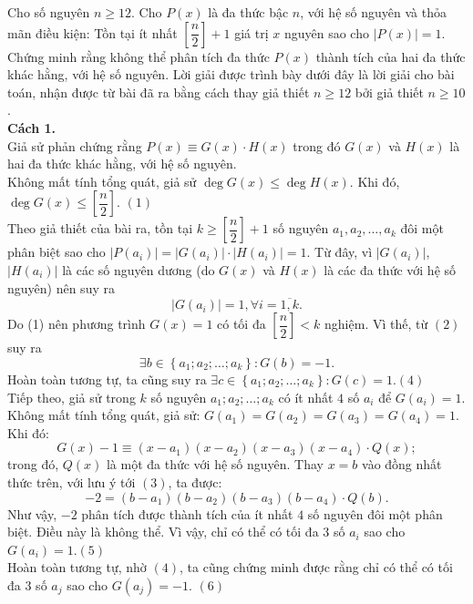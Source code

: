 \begin{bt}%
	Cho số nguyên $n \ge 12$. Cho $P(x)$ là đa thức bậc $n$, với hệ số nguyên và thỏa mãn điều kiện: Tồn tại ít nhất $\left[ {\dfrac{n}{2}} \right] + 1$ giá trị $x$ nguyên sao cho $\left| {P(x)} \right| = 1$. Chứng minh rằng không thể phân tích đa thức $P(x)$  thành tích của hai đa thức khác hằng, với hệ số nguyên.
\loigiai
{Lời giải được trình bày dưới đây là lời giải cho bài toán, nhận được từ bài đã ra bằng cách thay giả thiết $n\geq 12$ bởi giả thiết $n\geq 10$.\\
\textbf{Cách 1.} \\
Giả sử phản chứng rằng $P(x) \equiv G(x)\cdot H(x)$ trong đó $G(x)$ và $H(x)$ là hai đa thức khác hằng, với hệ số nguyên.\\
Không mất tính tổng quát, giả sử $\deg G(x) \le \deg H(x)$. Khi đó, $\deg G(x) \le \left[ \dfrac{n}{2} \right].$ \hfill$(1)$\\
Theo giả thiết của bài ra, tồn tại $k \ge \left[ {\dfrac{n}{2}} \right] + 1$ số nguyên $a_1, a_2,\ldots, a_k$ đôi một phân biệt sao cho
$| P(a_i)| = | G(a_i)|\cdot|H(a_i)| = 1$. Từ đây, vì  $| G(a_i)|$, $|H(a_i)|$ là các số nguyên dương (do $G(x)$ và $H(x)$ là các đa thức với hệ số nguyên) nên suy ra
\[| G(a_i)| = 1,\forall i = \overline {1,k}.\tag{2}\]
Do (1) nên phương trình $G(x) = 1$ có tối đa $\left[ \dfrac{n}{2} \right] < k$ nghiệm. Vì thế, từ $(2)$ suy ra
\[\exists b \in \left\{ a_1;a_2;\ldots;a_k \right\}: G(b) = - 1.\tag{3}\]
Hoàn toàn tương tự, ta cũng suy ra $\exists c \in \left\{ a_1;a_2;\ldots;a_k \right\}:G(c) = 1.$\hfill$(4)$\\
Tiếp theo, giả sử trong $k$ số nguyên $a_1;a_2;\ldots;a_k$ có ít nhất $4$ số $a_i$ để $G({a_i}) = 1$.\\
Không mất tính tổng quát, giả sử: $G(a_1) = G(a_2) = G(a_3) = G(a_4) = 1$. Khi đó:
$$G(x) - 1 \equiv (x - a_1)(x - a_2)(x - a_3)(x - a_4)\cdot Q(x);$$ 
trong đó, $Q(x)$  là một đa thức với hệ số nguyên. Thay $x = b$ vào đồng nhất thức trên, với lưu ý tới $(3)$, ta được: 
$$ - 2 = (b - a_1)(b - a_2)(b - a_3)(b - a_4)\cdot Q(b).$$
Như vậy, $-2$ phân tích được thành tích của ít nhất $4 $ số nguyên đôi một phân biệt. Điều này là không thể. Vì vậy, chỉ có thể có tối đa $3$ số $a_i$ sao cho
$G(a_i) = 1$.\hfill $ (5)$\\
Hoàn toàn tương tự, nhờ $(4)$, ta cũng chứng minh được rằng chỉ có thể có tối đa $3$ số $a_j$ sao cho $G(a_j) = -1$. \hfill $(6)$\\
}
\end{bt}
